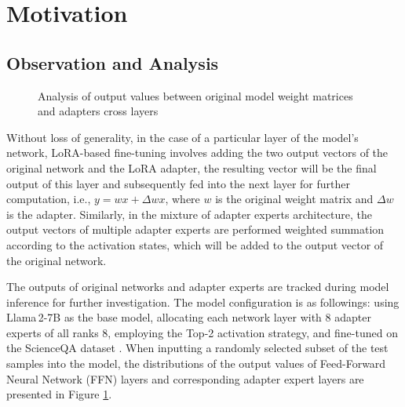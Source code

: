 \section{Motivation}\label{sec:motivation}
\subsection{Observation and Analysis}\label{subsec:observation}
\begin{figure}[t]
  \centering
  \caption{Analysis of output values between original model weight matrices and adapters cross layers}\label{fig:distribution}
\end{figure}

Without loss of generality, in the case of a particular layer of the model's network, LoRA-based fine-tuning involves adding the two output vectors of the original network and the LoRA adapter, the resulting vector will be the final output of this layer and subsequently fed into the next layer for further computation, i.e., $y=wx+\Delta wx$, where $w$ is the original weight matrix and $\Delta w$ is the adapter. Similarly, in the mixture of adapter experts architecture, the output vectors of multiple adapter experts are performed weighted summation according to the activation states, which will be added to the output vector of the original network. 

The outputs of original networks and adapter experts are tracked during model inference for further investigation. The model configuration is as followings: using Llama\,2-7B \cite{touvron2023llama} as the base model, allocating each network layer with 8 adapter experts of all ranks 8, employing the Top-2 activation strategy, and fine-tuned on the ScienceQA dataset \cite{lu2022learn}. When inputting a randomly selected subset of the test samples into the model, the distributions of the output values of Feed-Forward Neural Network (FFN) layers and corresponding adapter expert layers are presented in Figure \ref{fig:distribution}. 

